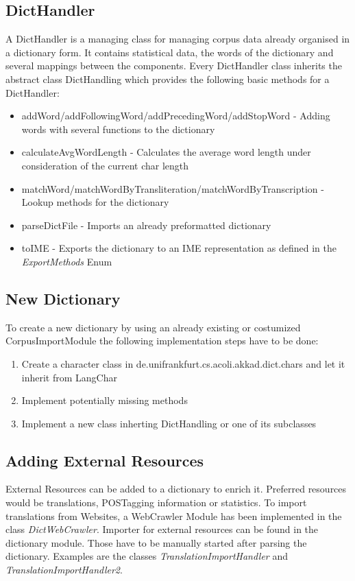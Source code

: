 \documentclass[10pt,a4paper,titlepage]{report}
\begin{document}
	\subsection{DictHandler}
	A DictHandler is a managing class for managing corpus data already organised in a dictionary form. It contains statistical data, the words of the dictionary and several mappings between the components.
	Every DictHandler class inherits the abstract class DictHandling which provides the following basic methods for a DictHandler: 
	\begin{itemize}
		\item addWord/addFollowingWord/addPrecedingWord/addStopWord - Adding words with several functions to the dictionary
		\item calculateAvgWordLength - Calculates the average word length under consideration of the current char length
		\item matchWord/matchWordByTransliteration/matchWordByTranscription - Lookup methods for the dictionary
		\item parseDictFile - Imports an already preformatted dictionary
		\item toIME - Exports the dictionary to an IME representation as defined in the \textit{ExportMethods} Enum
	\end{itemize} 
	\subsection{New Dictionary}
	To create a new dictionary by using an already existing or costumized CorpusImportModule the following implementation steps have to be done:
	\begin{enumerate}
		\item Create a character class in de.unifrankfurt.cs.acoli.akkad.dict.chars and let it inherit from LangChar
		\item Implement potentially missing methods
		\item Implement a new class inherting DictHandling or one of its subclasses
	\end{enumerate}
	\subsection{Adding External Resources}
	External Resources can be added to a dictionary to enrich it. Preferred resources would be translations, POSTagging information or statistics. To import translations from Websites, a WebCrawler Module has been implemented in the class \textit{DictWebCrawler}.
	Importer for external resources can be found in the dictionary module. Those have to be manually started after parsing the dictionary. Examples are the classes \textit{TranslationImportHandler} and \textit{TranslationImportHandler2}.
\end{document}
